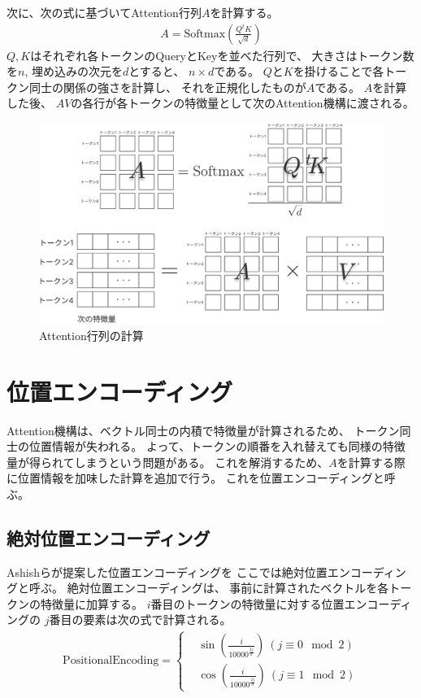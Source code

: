 \documentclass{jsarticle}
\begin{document}
    次に、次の式に基づいてAttention行列$A$を計算する。
    \begin{align*}
        A = \mathrm{Softmax}\left(\frac{Q^t\!K}{\sqrt{d}}\right)
    \end{align*}
    $Q, K$はそれぞれ各トークンのQueryとKeyを並べた行列で、
    大きさはトークン数を$n$,
    埋め込みの次元を$d$とすると、
    $n\times d$である。
    $Q$と$K$を掛けることで各トークン同士の関係の強さを計算し、
    それを正規化したものが$A$である。
    $A$を計算した後、
    $AV$の各行が各トークンの特徴量として次のAttention機構に渡される。
    \begin{figure}[h]
        \centering
        \includegraphics[width=.8\linewidth]{attention.pdf}
        \caption{Attention行列の計算}
    \end{figure}

\section{位置エンコーディング}
    Attention機構は、ベクトル同士の内積で特徴量が計算されるため、
    トークン同士の位置情報が失われる。
    よって、トークンの順番を入れ替えても同様の特徴量が得られてしまうという問題がある。
    これを解消するため、$A$を計算する際に位置情報を加味した計算を追加で行う。
    これを位置エンコーディングと呼ぶ。

    \subsection{絶対位置エンコーディング}
        Ashishら\cite{attention}が提案した位置エンコーディングを
        ここでは絶対位置エンコーディングと呼ぶ。
        絶対位置エンコーディングは、
        事前に計算されたベクトルを各トークンの特徴量に加算する。
        $i$番目のトークンの特徴量に対する位置エンコーディングの
        $j$番目の要素は次の式で計算される。
        \begin{align*}
            \mathrm{Positional Encoding} = \left\{
                \begin{aligned}
                    & \sin\left(\frac{i}{10000^{\frac{2j}{d}}}\right) \ (j\equiv 0 \mod 2) \\
                    & \cos\left(\frac{i}{10000^{\frac{2j}{d}}}\right) \ (j\equiv 1 \mod 2)
                \end{aligned}
                \right.
        \end{align*}
\end{document}
